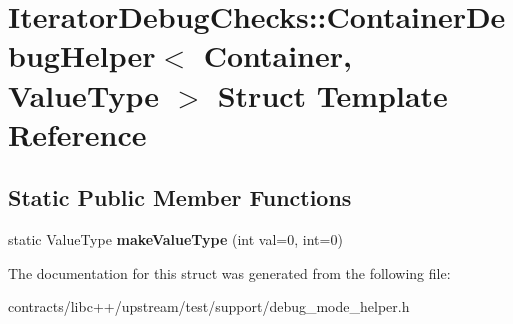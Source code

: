 \hypertarget{struct_iterator_debug_checks_1_1_container_debug_helper}{}\section{Iterator\+Debug\+Checks\+:\+:Container\+Debug\+Helper$<$ Container, Value\+Type $>$ Struct Template Reference}
\label{struct_iterator_debug_checks_1_1_container_debug_helper}
\subsection*{Static Public Member Functions}
\begin{DoxyCompactItemize}
\item 
\mbox{\label{struct_iterator_debug_checks_1_1_container_debug_helper_a50b17e712da0c561e5cab55682935b00}} 
static Value\+Type {\bfseries make\+Value\+Type} (int val=0, int=0)
\end{DoxyCompactItemize}


The documentation for this struct was generated from the following file\+:\begin{DoxyCompactItemize}
\item 
contracts/libc++/upstream/test/support/debug\+\_\+mode\+\_\+helper.\+h\end{DoxyCompactItemize}
